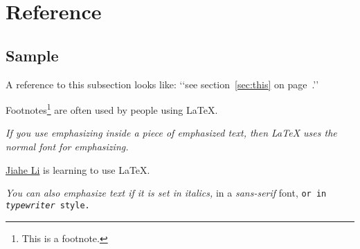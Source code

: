 \documentclass[a4paper,11pt]{article}
\begin{document}
\section{Reference}
\subsection{Sample}
A reference to this subsection
\label{sec:this} looks like:
‘‘see section~\ref{sec:this} on
page~\pageref{sec:this}.’’

Footnotes\footnote{This is
a footnote.} are often used
by people using \LaTeX.

\emph{If you use
emphasizing inside a piece
of emphasized text, then
\LaTeX{} uses the
\emph{normal} font for
emphasizing.}

\underline{Jiahe Li} is learning to use \LaTeX .

\textit{You can also
\emph{emphasize} text if
it is set in italics,}
\textsf{in a
\emph{sans-serif} font,}
\texttt{or in
\emph{typewriter} style.}
\end{document}
